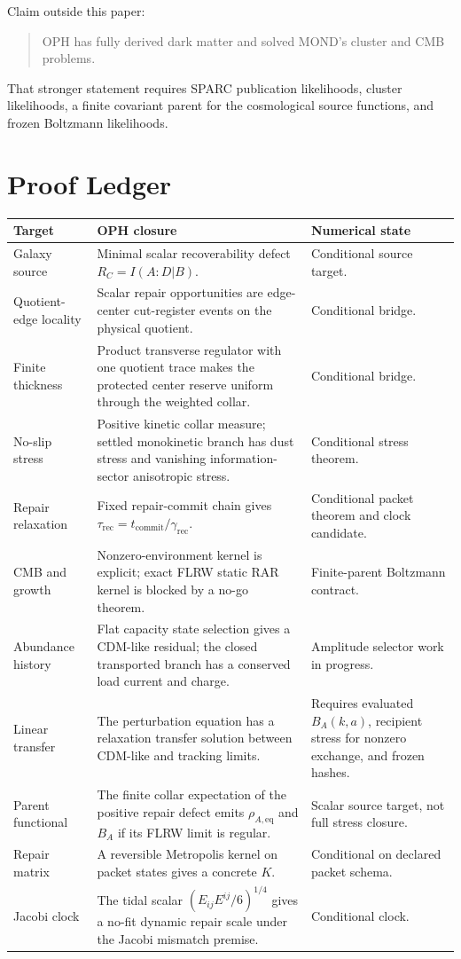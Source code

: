 \documentclass[11pt]{article}
\begin{document}
Claim outside this paper:
\begin{quote}
OPH has fully derived dark matter and solved MOND's cluster and CMB problems.
\end{quote}
That stronger statement requires SPARC publication likelihoods, cluster
likelihoods, a finite covariant parent for the cosmological source functions,
and frozen Boltzmann likelihoods.

\section{Proof Ledger}

\begin{center}
\begin{tabularx}{\textwidth}{@{}p{}Xp{}@{}}
\toprule
Target & OPH closure & Numerical state \\
\midrule
Galaxy source & Minimal scalar recoverability defect
\(R_C=I(A:D|B)\). & Conditional source target. \\
Quotient-edge locality & Scalar repair opportunities are edge-center
cut-register events on the physical quotient. & Conditional bridge. \\
Finite thickness & Product transverse regulator with one quotient trace makes
the protected center reserve uniform through the weighted collar. &
Conditional bridge. \\
No-slip stress & Positive kinetic collar measure; settled monokinetic branch
has dust stress and vanishing information-sector anisotropic stress. &
Conditional stress theorem. \\
Repair relaxation & Fixed repair-commit chain gives
\(\tau_{\mathrm{rec}}=t_{\mathrm{commit}}/\gamma_{\mathrm{rec}}\). &
Conditional packet theorem and clock candidate. \\
CMB and growth & Nonzero-environment kernel is explicit; exact FLRW static
RAR kernel is blocked by a no-go theorem. &
Finite-parent Boltzmann contract. \\
Abundance history & Flat capacity state selection gives a CDM-like residual;
the closed transported branch has a conserved load current and charge. &
Amplitude selector work in progress. \\
Linear transfer & The perturbation equation has a relaxation transfer
solution between CDM-like and tracking limits. & Requires evaluated
\(B_A(k,a)\), recipient stress for nonzero exchange, and frozen hashes. \\
Parent functional & The finite collar expectation of the positive repair
defect emits \(\rho_{A,\mathrm{eq}}\) and \(B_A\) if its FLRW limit is
regular. & Scalar source target, not full stress closure. \\
Repair matrix & A reversible Metropolis kernel on packet states gives a
concrete \(K\). & Conditional on declared packet schema. \\
Jacobi clock & The tidal scalar \((E_{ij}E^{ij}/6)^{1/4}\) gives a no-fit
dynamic repair scale under the Jacobi mismatch premise. & Conditional clock. \\
\bottomrule
\end{tabularx}
\end{center}
\end{document}
